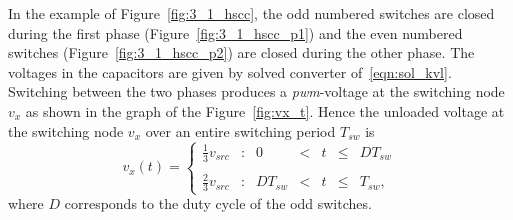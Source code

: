 In the example of Figure~\ref{fig:3_1_hscc}, the odd numbered switches are closed during the first phase (Figure~\ref{fig:3_1_hscc_p1}) and the even numbered switches (Figure~\ref{fig:3_1_hscc_p2}) are closed during the other phase. The voltages in the capacitors are given by solved converter of~\eqref{eqn:sol_kvl}. Switching between the two phases produces a \emph{pwm}-voltage at the switching node $v_x$ as shown in the graph of the Figure~\ref{fig:vx_t}. Hence  the unloaded  voltage at the switching node $v_x$ over an entire switching period $T_{sw}$ is
\begin{equation}
v_x(t) = \left\{
\begin{array}{lcccccr}
  \frac{1}{3} v_{src}   & : & 0   & < & t & \leq & D  T_{sw}  \\
  ~\\
   \frac{2}{3} v_{src} & : & D T_{sw} & < & t & \leq & T_{sw},
\end{array}
\right.
\label{eq:vx_t}
\end{equation}
where $D$ corresponds to the duty cycle of the odd switches.
